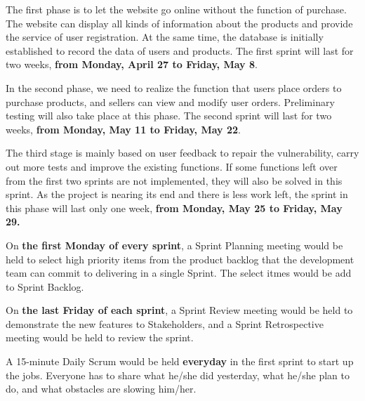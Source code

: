 \documentclass{report}
\begin{document}
The first phase is to let the website go online without the function of purchase. The website can display all kinds of information about the products and provide the service of user registration. At the same time, the database is initially established to record the data of users and products. The first sprint will last for two weeks, \textbf{from Monday, April 27 to Friday, May 8}. 

In the second phase, we need to realize the function that users place orders to purchase products, and sellers can view and modify user orders. Preliminary testing will also take place at this phase. The second sprint will last for two weeks, \textbf{from Monday, May 11 to Friday, May 22}.

The third stage is mainly based on user feedback to repair the vulnerability, carry out more tests and improve the existing functions. If some functions left over from the first two sprints are not implemented, they will also be solved in this sprint. As the project is nearing its end and there is less work left, the sprint in this phase will last only one week, \textbf{from Monday, May 25 to Friday, May 29.}

On \textbf{the first Monday of every sprint}, a Sprint Planning meeting would be held to select high priority items from the product backlog that the development team can commit to delivering in a single Sprint. The select itmes would be add to Sprint Backlog.

On \textbf{the last Friday of each sprint}, a Sprint Review meeting would be held to demonstrate the new features to Stakeholders, and a Sprint Retrospective meeting would be held to review the sprint.

A 15-minute Daily Scrum would be held \textbf{everyday} in the first sprint to start up the jobs. Everyone has to share what he/she did yesterday, what he/she plan to do, and what obstacles are slowing him/her.
\end{document}
